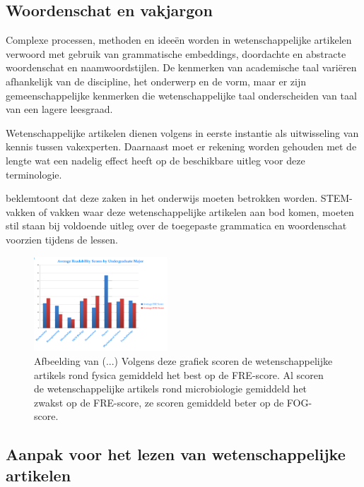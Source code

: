 
\subsection{Woordenschat en vakjargon}

Complexe processen, methoden en ideeën worden in wetenschappelijke artikelen verwoord met gebruik van grammatische embeddings, doordachte en abstracte woordenschat en naamwoordstijlen. De kenmerken van academische taal variëren afhankelijk van de discipline, het onderwerp en de vorm, maar er zijn gemeenschappelijke kenmerken die wetenschappelijke taal onderscheiden van taal van een lagere leesgraad. \autocite{Ennals2010, Snow2010}

Wetenschappelijke artikelen dienen volgens \textcite{PlavenSigray2017} in eerste instantie als uitwisseling van kennis tussen vakexperten. Daarnaast moet er rekening worden gehouden met de lengte wat een nadelig effect heeft op de beschikbare uitleg voor deze terminologie.

\textcite{Snow2010} beklemtoont dat deze zaken in het onderwijs moeten betrokken worden. STEM-vakken of vakken waar deze wetenschappelijke artikelen aan bod komen, moeten stil staan bij voldoende uitleg over de toegepaste grammatica en woordenschat voorzien tijdens de lessen.



\begin{figure}[H]
	\includegraphics[width=5cm]{img/fre-fog-per-sector.png}
	\caption{Afbeelding van (...) Volgens deze grafiek scoren de wetenschappelijke artikels rond fysica gemiddeld het best op de FRE-score. Al scoren de wetenschappelijke artikels rond microbiologie gemiddeld het zwakst op de FRE-score, ze scoren gemiddeld beter op de FOG-score.}
\end{figure}

\subsection{Aanpak voor het lezen van wetenschappelijke artikelen}

